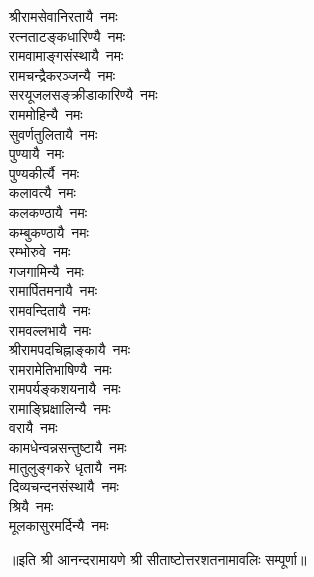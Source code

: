 \begin{multicols}{2}
\begin{flushleft}
श्रीरामसेवानिरतायै~नमः\\
रत्नताटङ्कधारिण्यै~नमः\\
रामवामाङ्गसंस्थायै~नमः\\
रामचन्द्रैकरञ्जन्यै~नमः\\
सरयूजलसङ्क्रीडाकारिण्यै~नमः\\
राममोहिन्यै~नमः\hfill{}\\
सुवर्णतुलितायै~नमः\\
पुण्यायै~नमः\\
पुण्यकीर्त्यै~नमः\\
कलावत्यै~नमः\\
कलकण्ठायै~नमः\\
कम्बुकण्ठायै~नमः\\
रम्भोरुवे~नमः\\
गजगामिन्यै~नमः\\
रामार्पितमनायै~नमः\\
रामवन्दितायै~नमः\hfill{}\\
रामवल्लभायै~नमः\\
श्रीरामपदचिह्नाङ्कायै~नमः\\
रामरामेतिभाषिण्यै~नमः\\
रामपर्यङ्कशयनायै~नमः\\
रामाङ्घ्रिक्षालिन्यै~नमः\\
वरायै~नमः\\
कामधेन्वन्नसन्तुष्टायै~नमः\\
मातुलुङ्गकरे धृतायै~नमः\\
दिव्यचन्दनसंस्थायै~नमः\\
श्रियै~नमः\hfill{}\\
मूलकासुरमर्दिन्यै~नमः\\
\end{flushleft}
\end{multicols}
॥इति श्री आनन्दरामायणे श्री सीताष्टोत्तरशतनामावलिः सम्पूर्णा॥
